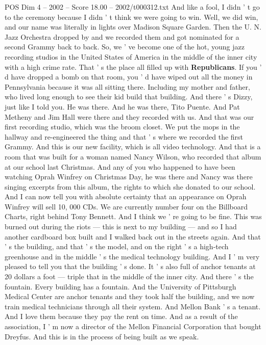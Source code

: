 \begin{textsample}{POS Dim 4 – 2002 – Score 18.00 – 2002/t000312.txt}
And like a fool, I didn ' t go to the ceremony because I didn ' t think we were going to win.
Well, we did win, and our name was literally in lights over Madison Square Garden.
Then the U.
N.
Jazz Orchestra dropped by and we recorded them and got nominated for a second Grammy back to back.
So, we ' ve become one of the hot, young jazz recording studios in the United States of America in the middle of the inner city with a high crime rate.
That ' s the place all filled up with \textbf{Republicans}.
If you ' d have dropped a bomb on that room, you ' d have wiped out all the money in Pennsylvania because it was all sitting there.
Including my mother and father, who lived long enough to see their kid build that building.
And there ' s Dizzy, just like I told you.
He was there.
And he was there, Tito Puente.
And Pat Metheny and Jim Hall were there and they recorded with us.
And that was our first recording studio, which was the broom closet.
We put the mops in the hallway and re-engineered the thing and that ' s where we recorded the first Grammy.
And this is our new facility, which is all video technology.
And that is a room that was built for a woman named Nancy Wilson, who recorded that album at our school last Christmas.
And any of you who happened to have been watching Oprah Winfrey on Christmas Day, he was there and Nancy was there singing excerpts from this album, the rights to which she donated to our school.
And I can now tell you with absolute certainty that an appearance on Oprah Winfrey will sell 10, 000 CDs.
We are currently number four on the Billboard Charts, right behind Tony Bennett.
And I think we ' re going to be fine.
This was burned out during the riots — this is next to my building — and so I had another cardboard box built and I walked back out in the streets again.
And that ' s the building, and that ' s the model, and on the right ' s a high-tech greenhouse and in the middle ' s the medical technology building.
And I ' m very pleased to tell you that the building ' s done.
It ' s also full of anchor tenants at 20 dollars a foot — triple that in the middle of the inner city.
And there ' s the fountain.
Every building has a fountain.
And the University of Pittsburgh Medical Center are anchor tenants and they took half the building, and we now train medical technicians through all their system.
And Mellon Bank ' s a tenant.
And I love them because they pay the rent on time.
And as a result of the association, I ' m now a director of the Mellon Financial Corporation that bought Dreyfus.
And this is in the process of being built as we speak.

\end{textsample}
